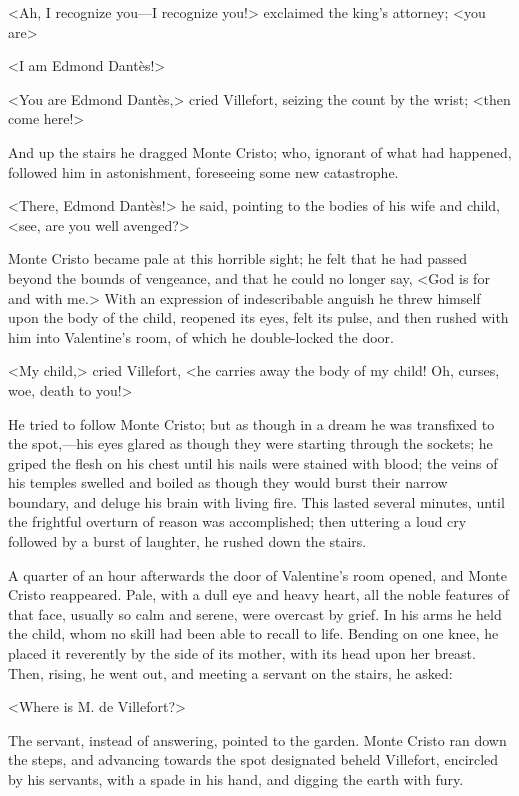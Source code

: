  <Ah, I recognize you—I recognize you!> exclaimed the king's attorney; <you are\longdash> 

 <I am Edmond Dantès!> 

 <You are Edmond Dantès,> cried Villefort, seizing the count by the wrist; <then come here!> 

 And up the stairs he dragged Monte Cristo; who, ignorant of what had happened, followed him in astonishment, foreseeing some new catastrophe. 

 <There, Edmond Dantès!> he said, pointing to the bodies of his wife and child, <see, are you well avenged?> 

 Monte Cristo became pale at this horrible sight; he felt that he had passed beyond the bounds of vengeance, and that he could no longer say, <God is for and with me.> With an expression of indescribable anguish he threw himself upon the body of the child, reopened its eyes, felt its pulse, and then rushed with him into Valentine's room, of which he double-locked the door. 

 <My child,> cried Villefort, <he carries away the body of my child! Oh, curses, woe, death to you!> 

 He tried to follow Monte Cristo; but as though in a dream he was transfixed to the spot,—his eyes glared as though they were starting through the sockets; he griped the flesh on his chest until his nails were stained with blood; the veins of his temples swelled and boiled as though they would burst their narrow boundary, and deluge his brain with living fire. This lasted several minutes, until the frightful overturn of reason was accomplished; then uttering a loud cry followed by a burst of laughter, he rushed down the stairs. 

 A quarter of an hour afterwards the door of Valentine's room opened, and Monte Cristo reappeared. Pale, with a dull eye and heavy heart, all the noble features of that face, usually so calm and serene, were overcast by grief. In his arms he held the child, whom no skill had been able to recall to life. Bending on one knee, he placed it reverently by the side of its mother, with its head upon her breast. Then, rising, he went out, and meeting a servant on the stairs, he asked: 

 <Where is M. de Villefort?> 

 The servant, instead of answering, pointed to the garden. Monte Cristo ran down the steps, and advancing towards the spot designated beheld Villefort, encircled by his servants, with a spade in his hand, and digging the earth with fury. 

